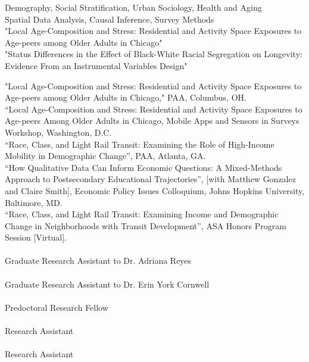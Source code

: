 \documentclass[11pt]{article} %
\begin{document}
\large{} Demography, Social Stratification, Urban Sociology, Health and Aging \\
\large{} Spatial Data Analysis, Causal Inference, Survey Methods \\


"Local Age-Composition and Stress: Residential and Activity Space Exposures to Age-peers among Older Adults in Chicago" \\
"Status Differences in the Effect of Black-White Racial Segregation on Longevity: Evidence From an Instrumental Variables Design" \\


 "Local Age-Composition and Stress: Residential and Activity Space Exposures to Age-peers among Older Adults in Chicago," PAA, Columbus, OH. \\
“Local Age-Composition and Stress: Residential and Activity Space Exposures to Age-peers Among Older Adults in Chicago, Mobile Apps and Sensors in Surveys Workshop, Washington, D.C. \\
 “Race, Class, and Light Rail Transit: Examining the Role of High-Income Mobility in Demographic Change”, PAA, Atlanta, GA. \\
“How Qualitative Data Can Inform Economic Questions: A Mixed-Methods Approach to Postsecondary Educational Trajectories”, [with Matthew Gonzalez and Claire Smith], Economic Policy Issues Colloquium, Johns Hopkins University, Baltimore, MD. \\
  “Race, Class, and Light Rail Transit: Examining Income and Demographic Change in Neighborhoods with Transit Development”, ASA Honors Program Session [Virtual]. \\

 \\ 
Graduate Research Assistant to Dr. Adriana Reyes \\
 \\ 
Graduate Research Assistant to Dr. Erin York Cornwell \\  
 \\ Predoctoral Research Fellow \\
 \\ Research Assistant \\ 
 \\ Research Assistant \\ 
\end{document}
